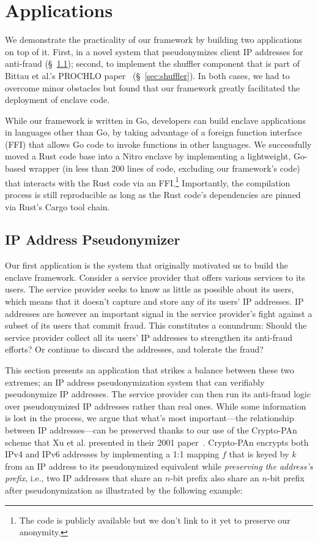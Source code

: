 \section{Applications}
\label{sec:applications}

We demonstrate the practicality of our framework by building two applications on
top of it.  First, in a novel system that pseudonymizes client IP addresses for
anti-fraud (\S~\ref{sec:pseudonymization}); second, to implement the shuffler
component that is part of Bittau et al.'s PROCHLO paper~\cite{Bittau2017a}
(\S~\ref{sec:shuffler}).  In both cases, we had to overcome minor obstacles but
found that our framework greatly facilitated the deployment of enclave code.

While our framework is written in Go, developers can build enclave applications
in languages other than Go, by taking advantage of a foreign function interface
(FFI) that allows Go code to invoke functions in other languages.  We
successfully moved a Rust code base into a Nitro enclave by implementing a
lightweight, Go-based wrapper (in less than 200 lines of code, excluding our
framework's code) that interacts with the Rust code via an FFI.\footnote{The
code is publicly available but we don't link to it yet to preserve our
anonymity.} Importantly, the compilation process is still reproducible as long
as the Rust code's dependencies are pinned via Rust's Cargo tool chain.

\subsection{IP Address Pseudonymizer}
\label{sec:pseudonymization}

Our first application is the system that originally motivated us to build the
enclave framework. Consider a service provider that offers various services to
its users.  The service provider seeks to know as little as possible about its
users, which means that it doesn't capture and store any of its users' IP
addresses.  IP addresses are however an important signal in the service
provider's fight against a subset of its users that commit fraud.  This
constitutes a conundrum: Should the service provider collect all its users' IP
addresses to strengthen its anti-fraud efforts?  Or continue to discard the
addresses, and tolerate the fraud?

This section presents an application that strikes a balance between these two
extremes; an IP address pseudonymization system that can verifiably pseudonymize
IP addresses.  The service provider can then run its anti-fraud logic over
pseudonymized IP addresses rather than real ones.  While some information is
lost in the process, we argue that what's most important---the relationship
between IP addresses---can be preserved thanks to our use of the Crypto-PAn
scheme that Xu et al. presented in their 2001 paper~\cite{Xu01a}.  Crypto-PAn
encrypts both IPv4 and IPv6 addresses by implementing a 1:1 mapping $f$ that is
keyed by $k$ from an IP address to its pseudonymized equivalent while
\emph{preserving the address's prefix}, i.e., two IP addresses that share an
$n$-bit prefix also share an $n$-bit prefix after pseudonymization as
illustrated by the following example:

